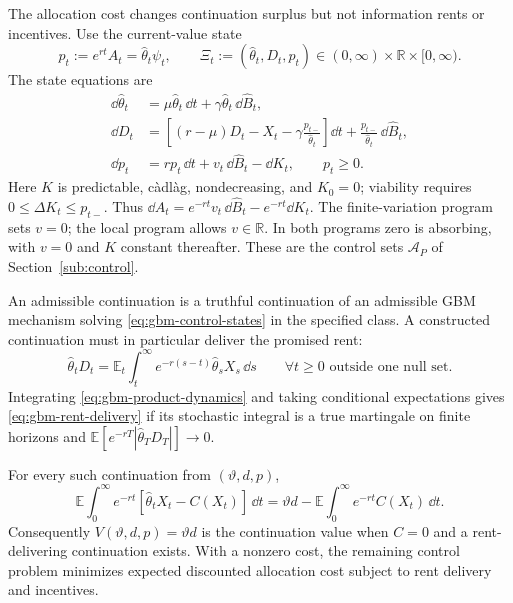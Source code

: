 \documentclass[12pt]{article}
\newcommand{\E}{\mathbb{E}}
\newcommand{\hth}{\hat\theta}
\newcommand{\hB}{\hat B}
\begin{document}
The allocation cost changes continuation surplus but not information
rents or incentives. Use the current-value state
\[
  p_t:=e^{rt}A_t=\hth_t\psi_t,
  \qquad \Xi_t:=(\hth_t,D_t,p_t)
    \in(0,\infty)\times\mathbb R\times[0,\infty).
\]
The state equations are
\begin{equation}\label{eq:gbm-control-states}
\begin{aligned}
  \dd\hth_t&=\mu\hth_t\,\dd t+\gamma\hth_t\,\dd\hB_t,\\
  \dd D_t&=\left[(r-\mu)D_t-X_t
                    -\gamma\frac{p_{t-}}{\hth_t}\right]\dd t
                  +\frac{p_{t-}}{\hth_t}\,\dd\hB_t,\\
  \dd p_t&=rp_t\,\dd t+v_t\,\dd\hB_t-\dd K_t,
       \qquad p_t\geq0.
\end{aligned}
\end{equation}
Here \(K\) is predictable, c\`adl\`ag, nondecreasing, and
\(K_0=0\); viability requires \(0\leq\Delta K_t\leq p_{t-}\).
Thus
\(\dd A_t=e^{-rt}v_t\,\dd\hB_t-e^{-rt}\dd K_t\).
The finite-variation program sets \(v=0\); the local program allows
\(v\in\mathbb R\). In both programs zero is absorbing, with
\(v=0\) and \(K\) constant thereafter. These are the control sets
\(\mathcal A_P\) of Section~\ref{sub:control}.

An admissible continuation is a truthful continuation of an admissible
GBM mechanism solving \eqref{eq:gbm-control-states} in the specified
class. A constructed continuation must in particular deliver the
promised rent:
\begin{equation}\label{eq:gbm-rent-delivery}
  \hth_tD_t=\E_t\int_t^\infty
       e^{-r(s-t)}\hth_sX_s\,\dd s
  \qquad\forall t\geq0\text{ outside one null set}.
\end{equation}
Integrating \eqref{eq:gbm-product-dynamics} and taking conditional
expectations gives \eqref{eq:gbm-rent-delivery} if its stochastic
integral is a true martingale on finite horizons and
\(\E[e^{-rT}|\hth_TD_T|]\to0\).

For every such continuation from \((\vartheta,d,p)\),
\begin{equation}\label{eq:gbm-surplus-cost}
  \E\int_0^\infty e^{-rt}
       [\hth_tX_t-C(X_t)]\,\dd t
   =\vartheta d-\E\int_0^\infty e^{-rt}C(X_t)\,\dd t.
\end{equation}
Consequently \(V(\vartheta,d,p)=\vartheta d\) is the continuation
value when \(C=0\) and a rent-delivering continuation exists. With
a nonzero cost, the remaining control problem minimizes expected
discounted allocation cost subject to rent delivery and incentives.
\end{document}
